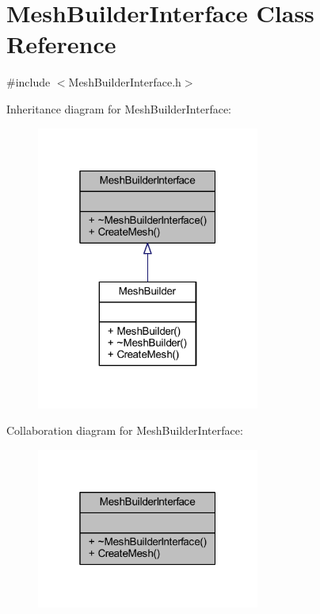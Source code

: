 \hypertarget{class_mesh_builder_interface}{}\section{Mesh\+Builder\+Interface Class Reference}
\label{class_mesh_builder_interface}


{\ttfamily \#include $<$Mesh\+Builder\+Interface.\+h$>$}



Inheritance diagram for Mesh\+Builder\+Interface\+:
\nopagebreak
\begin{figure}[H]
\begin{center}
\leavevmode
\includegraphics[width=208pt]{class_mesh_builder_interface__inherit__graph}
\end{center}
\end{figure}


Collaboration diagram for Mesh\+Builder\+Interface\+:
\nopagebreak
\begin{figure}[H]
\begin{center}
\leavevmode
\includegraphics[width=208pt]{class_mesh_builder_interface__coll__graph}
\end{center}
\end{figure}
